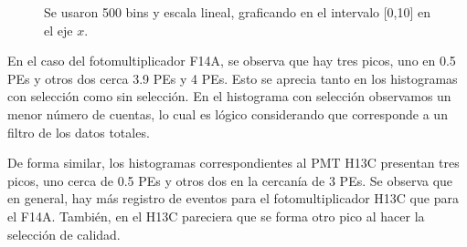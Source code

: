 \documentclass[11pt]{article}
\begin{document}
\begin{figure}[H]
\centering
{}

\caption{Se usaron 500 bins y escala lineal, graficando en el intervalo [0,10] en el eje $x$.}
\label{fig:NormScale}
\end{figure}

En el caso del fotomultiplicador F14A, se observa que hay tres picos, uno en 0.5 PEs y otros dos cerca 3.9 PEs y 4 PEs. Esto se aprecia tanto en los histogramas con selección como sin selección. En el histograma con selección observamos un menor número de cuentas, lo cual es lógico considerando que corresponde a un filtro de los datos totales. 

De forma similar, los histogramas correspondientes al PMT H13C presentan tres picos, uno cerca de 0.5 PEs y otros dos en la cercanía de 3 PEs. Se observa que en general, hay más registro de eventos para el fotomultiplicador H13C que para el F14A. También, en el H13C pareciera que se forma otro pico al hacer la selección de calidad.
\end{document}

